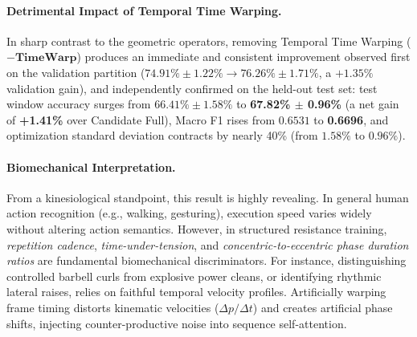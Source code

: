 \documentclass[preprint,12pt]{elsarticle}
\begin{document}
\paragraph{Detrimental Impact of Temporal Time Warping.}
In sharp contrast to the geometric operators, removing Temporal Time Warping ($\mathbf{-TimeWarp}$) produces an immediate and consistent improvement observed first on the validation partition ($74.91\% \pm 1.22\% \to 76.26\% \pm 1.71\%$, a $+1.35\%$ validation gain), and independently confirmed on the held-out test set: test window accuracy surges from $66.41\% \pm 1.58\%$ to \textbf{67.82\% $\pm$ 0.96\%} (a net gain of \textbf{+1.41\%} over Candidate Full), Macro F1 rises from $0.6531$ to \textbf{0.6696}, and optimization standard deviation contracts by nearly 40\% (from $1.58\%$ to $0.96\%$). 

\paragraph{Biomechanical Interpretation.}
From a kinesiological standpoint, this result is highly revealing. In general human action recognition (e.g., walking, gesturing), execution speed varies widely without altering action semantics. However, in structured resistance training, \textit{repetition cadence}, \textit{time-under-tension}, and \textit{concentric-to-eccentric phase duration ratios} are fundamental biomechanical discriminators. For instance, distinguishing controlled barbell curls from explosive power cleans, or identifying rhythmic lateral raises, relies on faithful temporal velocity profiles. Artificially warping frame timing distorts kinematic velocities ($\Delta p / \Delta t$) and creates artificial phase shifts, injecting counter-productive noise into sequence self-attention.
\end{document}
